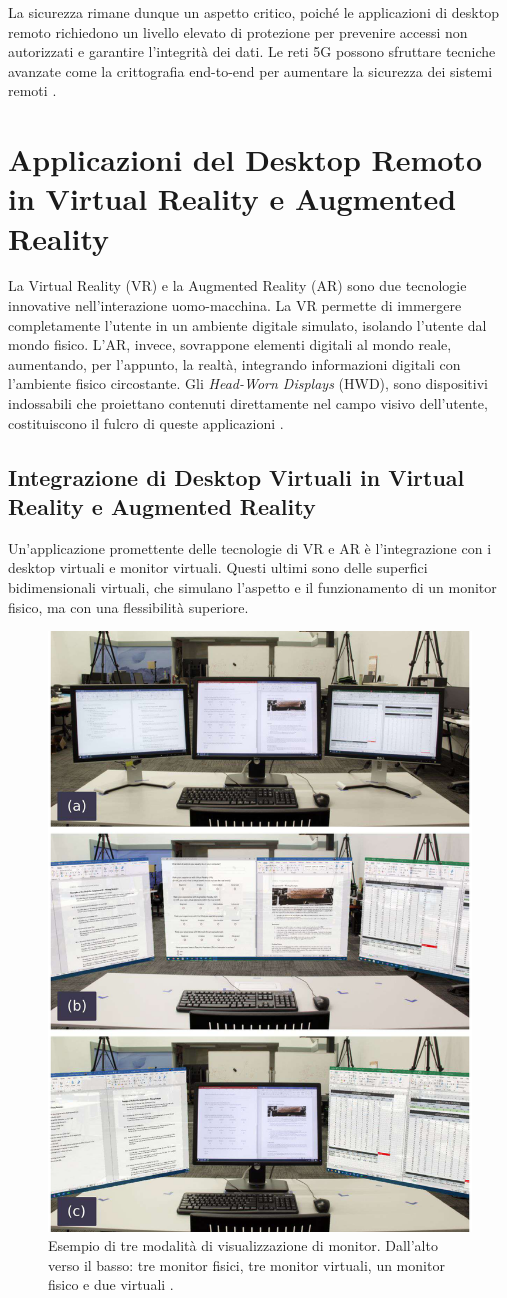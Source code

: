 \documentclass[12pt,a4paper,openright,twoside]{book}
\begin{document}
La sicurezza rimane dunque un aspetto critico, poiché le applicazioni di desktop remoto richiedono un livello elevato di protezione per prevenire accessi non autorizzati e garantire l'integrità dei dati. Le reti 5G possono sfruttare tecniche avanzate come la crittografia end-to-end per aumentare la sicurezza dei sistemi remoti \cite{Sahu2024}.


\section{Applicazioni del Desktop Remoto in Virtual Reality e Augmented Reality}

La Virtual Reality (VR) e la Augmented Reality (AR) sono due tecnologie innovative nell'interazione uomo-macchina. La VR permette di immergere completamente l'utente in un ambiente digitale simulato, isolando l'utente dal mondo fisico. L'AR, invece, sovrappone elementi digitali al mondo reale, aumentando, per l'appunto, la realtà, integrando informazioni digitali con l'ambiente fisico circostante. Gli \textit{Head-Worn Displays} (HWD), sono dispositivi indossabili che proiettano contenuti direttamente nel campo visivo dell'utente, costituiscono il fulcro di queste applicazioni \cite{pavanatto2021, frontiers2023}.

\subsection{Integrazione di Desktop Virtuali in Virtual Reality e Augmented Reality}

Un'applicazione promettente delle tecnologie di VR e AR è l'integrazione con i desktop virtuali e monitor virtuali. Questi ultimi sono delle superfici bidimensionali virtuali, che simulano l'aspetto e il funzionamento di un monitor fisico, ma con una flessibilità superiore\cite{pavanatto2021, frontiers2023}.
\begin{figure}
    \centering
    \includegraphics[width=.4\linewidth]{figures/virtual_monitors.jpg}
    \caption[xarch]{Esempio di tre modalità di visualizzazione di monitor. Dall'alto verso il basso: tre monitor fisici, tre monitor virtuali, un monitor fisico e due virtuali \cite{pavanatto2021}.}
\end{figure}
\end{document}
